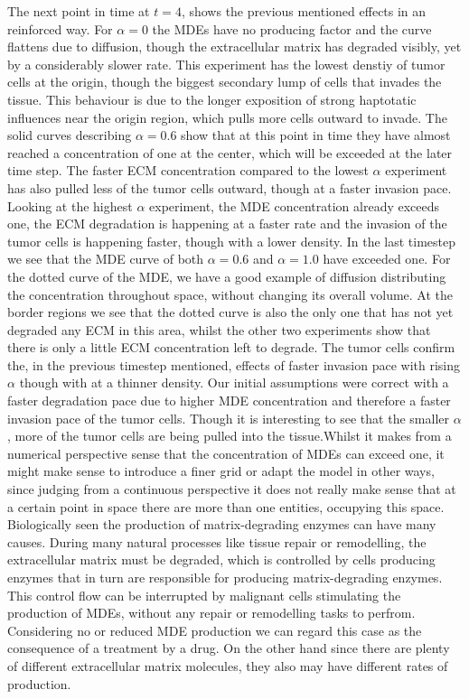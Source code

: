 The next point in time at $t=4$, shows the previous mentioned effects in an reinforced way. For $\alpha=0$ the MDEs have no producing factor and the curve flattens due to diffusion, though the extracellular matrix has degraded visibly, yet by a considerably slower rate. This experiment has the lowest denstiy of tumor cells at the origin, though the biggest secondary lump of cells that invades the tissue. This behaviour is due to the longer exposition of strong haptotatic influences near the origin region, which pulls more cells outward to invade.
The solid curves describing $\alpha = 0.6$ show that at this point in time they have almost reached a concentration of one at the center, which will be exceeded at the later time step. The faster ECM concentration compared to the lowest $\alpha$ experiment has also pulled less of the tumor cells outward, though at a faster invasion pace. 
Looking at the highest $\alpha$ experiment, the MDE concentration already exceeds one, the ECM degradation is happening at a faster rate and the invasion of the tumor cells is happening faster, though with a lower density.\newline
In the last timestep we see that the MDE curve of both $\alpha=0.6$ and $\alpha=1.0$ have exceeded one. For the dotted curve of the MDE, we have a good example of diffusion distributing the concentration throughout space, without changing its overall volume. At the border regions we see that the dotted curve is also the only one that has not yet degraded any ECM in this area, whilst the other two experiments show that there is only a little ECM concentration left to degrade. 
The tumor cells confirm the, in the previous timestep mentioned, effects of faster invasion pace with rising $\alpha$ though with at a thinner density.
\newline
Our initial assumptions were correct with a faster degradation pace due to higher MDE concentration and therefore a faster invasion pace of the tumor cells. Though it is interesting to see that the smaller $\alpha$, more of the tumor cells are being pulled into the tissue.\newline  Whilst it makes from a numerical perspective sense that the concentration of MDEs can exceed one, it might make sense to introduce a finer grid or adapt the model in other ways, since judging from a continuous perspective it does not really make sense that at a certain point in space there are more than one entities, occupying this space.\newline
Biologically seen the production of matrix-degrading enzymes can have many causes. During many natural processes like tissue repair or remodelling, the extracellular matrix must be degraded, which is controlled by cells producing enzymes that in turn are responsible for producing matrix-degrading enzymes. This control flow can be interrupted by malignant cells stimulating the production of MDEs, without any repair or remodelling tasks to perfrom. Considering no or reduced MDE production we can regard this case as the consequence of a treatment by a drug. On the other hand since there are plenty of different extracellular matrix molecules, they also may have different rates of production.

